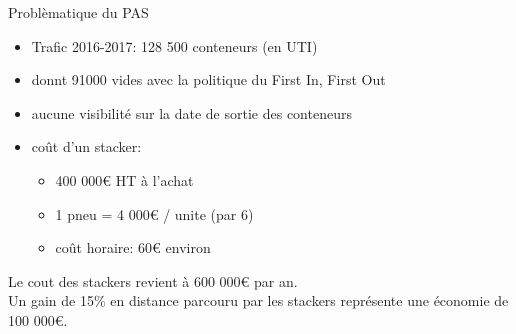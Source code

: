 \begin{frame}{Problèmatique du PAS}
      \begin{itemize}
      \item Trafic 2016-2017: 128 500 conteneurs (en UTI)
      \item donnt 91000 vides avec la politique du First In, First Out
      \item aucune visibilité sur la date de sortie des conteneurs
      \item coût d'un stacker:
        \begin{itemize}
        \item 400 000\euro{}  HT à l'achat
        \item 1 pneu = 4 000\euro{} / unite (par 6)
        \item coût horaire: 60\euro{}  environ
        \end{itemize}
      \end{itemize}
      
      Le cout des stackers revient à 600 000\euro{}  par an.\\
      Un gain de 15\% en distance parcouru par les stackers représente une économie de 100 000\euro.
\end{frame}

